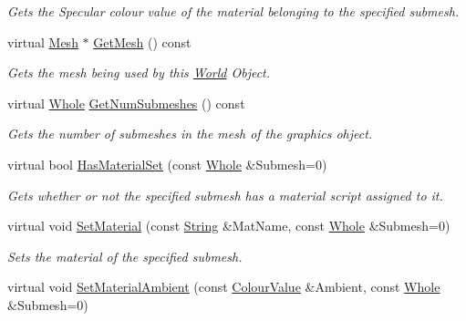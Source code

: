 \begin{DoxyCompactItemize}
\begin{DoxyCompactList}\small\item\em Gets the Specular colour value of the material belonging to the specified submesh. \item\end{DoxyCompactList}\item 
virtual \hyperlink{classMezzanine_1_1Mesh}{Mesh} $\ast$ \hyperlink{classMezzanine_1_1WorldObjectGraphicsSettings_ac45583fcb933c439025237d1d5634ce1}{GetMesh} () const 
\begin{DoxyCompactList}\small\item\em Gets the mesh being used by this \hyperlink{classMezzanine_1_1World}{World} Object. \item\end{DoxyCompactList}\item 
virtual \hyperlink{namespaceMezzanine_adcbb6ce6d1eb4379d109e51171e2e493}{Whole} \hyperlink{classMezzanine_1_1WorldObjectGraphicsSettings_ae1e210b72aac44a75890acdb777baa9c}{GetNumSubmeshes} () const 
\begin{DoxyCompactList}\small\item\em Gets the number of submeshes in the mesh of the graphics ohject. \item\end{DoxyCompactList}\item 
virtual bool \hyperlink{classMezzanine_1_1WorldObjectGraphicsSettings_a90d4e4516181052ea6afcb257a864887}{HasMaterialSet} (const \hyperlink{namespaceMezzanine_adcbb6ce6d1eb4379d109e51171e2e493}{Whole} \&Submesh=0)
\begin{DoxyCompactList}\small\item\em Gets whether or not the specified submesh has a material script assigned to it. \item\end{DoxyCompactList}\item 
virtual void \hyperlink{classMezzanine_1_1WorldObjectGraphicsSettings_a99a72f423f55280da67c4691d220c9a4}{SetMaterial} (const \hyperlink{namespaceMezzanine_acf9fcc130e6ebf08e3d8491aebcf1c86}{String} \&MatName, const \hyperlink{namespaceMezzanine_adcbb6ce6d1eb4379d109e51171e2e493}{Whole} \&Submesh=0)
\begin{DoxyCompactList}\small\item\em Sets the material of the specified submesh. \item\end{DoxyCompactList}\item 
virtual void \hyperlink{classMezzanine_1_1WorldObjectGraphicsSettings_a88597e16ded3a60970c28683c7cb756a}{SetMaterialAmbient} (const \hyperlink{classMezzanine_1_1ColourValue}{ColourValue} \&Ambient, const \hyperlink{namespaceMezzanine_adcbb6ce6d1eb4379d109e51171e2e493}{Whole} \&Submesh=0)

\end{DoxyCompactItemize}
